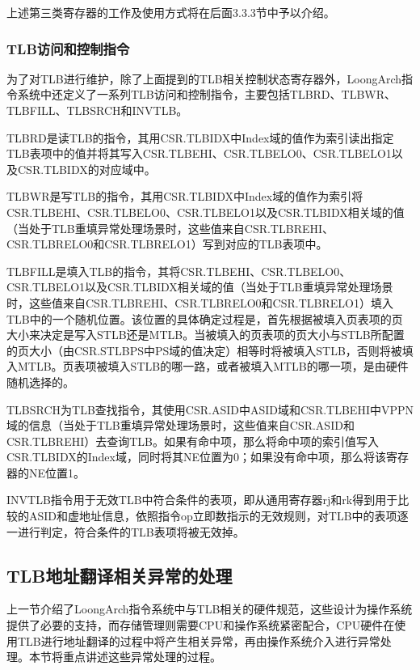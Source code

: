 \documentclass[]{ctexbook}
\begin{document}
上述第三类寄存器的工作及使用方式将在后面3.3.3节中予以介绍。

\hypertarget{tlbux8bbfux95eeux548cux63a7ux5236ux6307ux4ee4}{%
\subsubsection{TLB访问和控制指令}\label{tlbux8bbfux95eeux548cux63a7ux5236ux6307ux4ee4}}

为了对TLB进行维护，除了上面提到的TLB相关控制状态寄存器外，LoongArch指令系统中还定义了一系列TLB访问和控制指令，主要包括TLBRD、TLBWR、TLBFILL、TLBSRCH和INVTLB。

TLBRD是读TLB的指令，其用CSR.TLBIDX中Index域的值作为索引读出指定TLB表项中的值并将其写入CSR.TLBEHI、CSR.TLBELO0、CSR.TLBELO1以及CSR.TLBIDX的对应域中。

TLBWR是写TLB的指令，其用CSR.TLBIDX中Index域的值作为索引将CSR.TLBEHI、CSR.TLBELO0、CSR.TLBELO1以及CSR.TLBIDX相关域的值（当处于TLB重填异常处理场景时，这些值来自CSR.TLBREHI、CSR.TLBRELO0和CSR.TLBRELO1）写到对应的TLB表项中。

TLBFILL是填入TLB的指令，其将CSR.TLBEHI、CSR.TLBELO0、CSR.TLBELO1以及CSR.TLBIDX相关域的值（当处于TLB重填异常处理场景时，这些值来自CSR.TLBREHI、CSR.TLBRELO0和CSR.TLBRELO1）填入TLB中的一个随机位置。该位置的具体确定过程是，首先根据被填入页表项的页大小来决定是写入STLB还是MTLB。当被填入的页表项的页大小与STLB所配置的页大小（由CSR.STLBPS中PS域的值决定）相等时将被填入STLB，否则将被填入MTLB。页表项被填入STLB的哪一路，或者被填入MTLB的哪一项，是由硬件随机选择的。

TLBSRCH为TLB查找指令，其使用CSR.ASID中ASID域和CSR.TLBEHI中VPPN域的信息（当处于TLB重填异常处理场景时，这些值来自CSR.ASID和CSR.TLBREHI）去查询TLB。如果有命中项，那么将命中项的索引值写入CSR.TLBIDX的Index域，同时将其NE位置为0；如果没有命中项，那么将该寄存器的NE位置1。

INVTLB指令用于无效TLB中符合条件的表项，即从通用寄存器rj和rk得到用于比较的ASID和虚地址信息，依照指令op立即数指示的无效规则，对TLB中的表项逐一进行判定，符合条件的TLB表项将被无效掉。

\hypertarget{sec-tlb-ex}{%
\subsection{TLB地址翻译相关异常的处理}\label{sec-tlb-ex}}

上一节介绍了LoongArch指令系统中与TLB相关的硬件规范，这些设计为操作系统提供了必要的支持，而存储管理则需要CPU和操作系统紧密配合，CPU硬件在使用TLB进行地址翻译的过程中将产生相关异常，再由操作系统介入进行异常处理。本节将重点讲述这些异常处理的过程。
\end{document}
